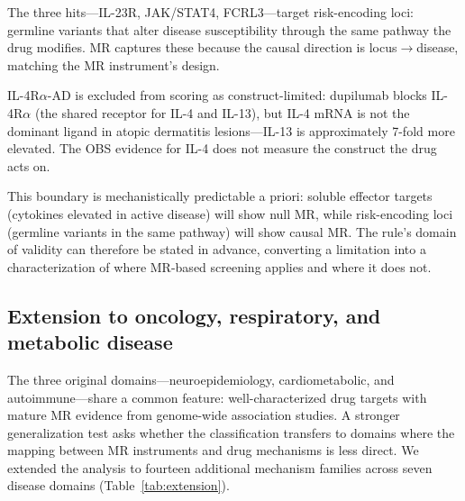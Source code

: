 \documentclass[11pt]{article}
\begin{document}
The three hits---IL-23R, JAK/STAT4, FCRL3---target risk-encoding loci: germline variants that alter disease susceptibility through the same pathway the drug modifies. MR captures these because the causal direction is locus$\to$disease, matching the MR instrument's design.

IL-4R$\alpha$-AD is excluded from scoring as construct-limited: dupilumab blocks IL-4R$\alpha$ (the shared receptor for IL-4 and IL-13), but IL-4 mRNA is not the dominant ligand in atopic dermatitis lesions---IL-13 is approximately 7-fold more elevated. The OBS evidence for IL-4 does not measure the construct the drug acts on.

This boundary is mechanistically predictable a priori: soluble effector targets (cytokines elevated in active disease) will show null MR, while risk-encoding loci (germline variants in the same pathway) will show causal MR. The rule's domain of validity can therefore be stated in advance, converting a limitation into a characterization of where MR-based screening applies and where it does not.

\subsection{Extension to oncology, respiratory, and metabolic disease}
\label{sec:extension}

The three original domains---neuroepidemiology, cardiometabolic, and autoimmune---share a common feature: well-characterized drug targets with mature MR evidence from genome-wide association studies. A stronger generalization test asks whether the classification transfers to domains where the mapping between MR instruments and drug mechanisms is less direct. We extended the analysis to fourteen additional mechanism families across seven disease domains (Table~\ref{tab:extension}).
\end{document}
